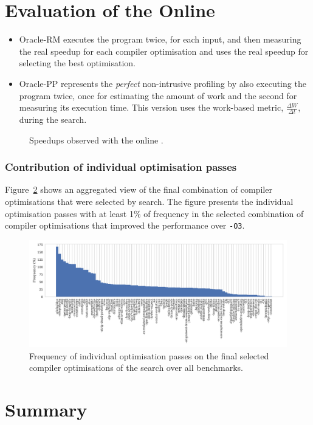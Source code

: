 \section{Evaluation of the Online {\IterComp}}

\begin{itemize}
\item Oracle-RM executes the program twice, for each input, and then measuring the real speedup for each compiler optimisation and uses the real speedup for selecting the best optimisation.
\item Oracle-PP represents the \textit{perfect} non-intrusive profiling by also executing the program twice, once for estimating the amount of work and the second for measuring its execution time.
This version uses the work-based metric, $\frac{\Delta W}{\Delta t}$, during the {\itercomp} search.
\end{itemize}

\begin{figure}[htb]
    \centering
    \caption{Speedups observed with the online {\itercomp}.}
    \label{fig:speedups}
\end{figure}


\subsubsection{Contribution of individual optimisation passes}

Figure~\ref{fig:flagsfreq} shows an aggregated view of the final combination of compiler optimisations that were selected by {\itercomp} search.
The figure presents the individual optimisation passes with at least 1\% of frequency in the selected combination of compiler optimisations that improved the performance over {\texttt{-O3}}.

\begin{figure}[htb]
    \centering
    \includegraphics[width=\textwidth]{figs/flagsfreq.pdf}
    \caption{Frequency of individual optimisation passes on the final selected 
             compiler optimisations of the {\itercomp} search over
             all benchmarks.}
    \label{fig:flagsfreq}
\end{figure}

\section{Summary}

